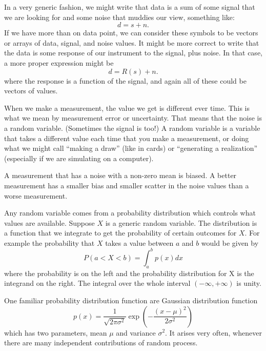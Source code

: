 In a very generic fashion, we might write that data is a sum of some signal that we are looking for and some noise that muddies our view, something like:
\begin{equation}
  d = s + n.
\end{equation}
If we have more than on data point, we can consider these symbols to be vectors or arrays of data, signal, and noise values.  It might be more correct to write that the data is some response of our instrument to the signal, plus noise.  In that case, a more proper expression might be
\begin{equation}
  d = R(s) + n.
\end{equation}
where the response is a function of the signal, and again all of these could be vectors of values.

When we make a measurement, the value we get is different ever time.  This is what we mean by measurement error or uncertainty.  That means that the noise is a random variable. (Sometimes the signal is too!)  A random variable is a variable that takes a different value each time that you make a measurement, or doing what we might call  ``making a draw'' (like in cards) or ``generating a realization'' (especially if we are simulating on a computer).

A measurement that has a noise with a non-zero mean is biased.  A better measurement has a smaller bias and smaller scatter in the noise values than a worse measurement.

Any random variable comes from a probability distribution which controls what values are available.  Suppose $X$ is a generic random variable.  The distribution is a function that we integrate to get the probability of certain outcomes for $X$.  For example the probability that $X$ takes a value between $a$ and $b$ would be given by
\begin{equation}
  P(a<X<b) = \int_a^b p(x) dx
\end{equation}
where the probability is on the left and the probability distribution for X is the integrand on the right.  The integral over the whole interval $(-\infty, +\infty)$ is unity.

One familiar probability distribution function are Gaussian distribution function
\begin{equation}
  p(x) = \frac{1}{\sqrt{2\pi \sigma^2}} \exp \left( -\frac{(x-\mu)^2}{2\sigma^2}   \right)
\end{equation}
which has two parameters, mean $\mu$ and variance $\sigma^2$.  It arises very often, whenever there are many independent contributions of random process.

